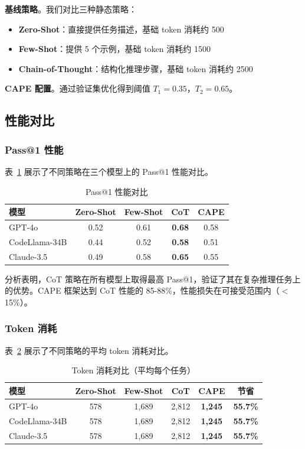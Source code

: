\documentclass[11pt,a4paper]{article}
\begin{document}
\textbf{基线策略}。我们对比三种静态策略：
\begin{itemize}[leftmargin=*]
    \item \textbf{Zero-Shot}：直接提供任务描述，基础 token 消耗约 500
    \item \textbf{Few-Shot}：提供 5 个示例，基础 token 消耗约 1500
    \item \textbf{Chain-of-Thought}：结构化推理步骤，基础 token 消耗约 2500
\end{itemize}

\textbf{CAPE 配置}。通过验证集优化得到阈值 $T_1 = 0.35$，$T_2 = 0.65$。

\subsection{性能对比}

\subsubsection{Pass@1 性能}

表~\ref{tab:pass1} 展示了不同策略在三个模型上的 Pass@1 性能对比。

\begin{table}[h]
\centering
\caption{Pass@1 性能对比}
\label{tab:pass1}
\begin{tabular}{lcccc}
\toprule
\textbf{模型} & \textbf{Zero-Shot} & \textbf{Few-Shot} & \textbf{CoT} & \textbf{CAPE} \\
\midrule
GPT-4o & 0.52 & 0.61 & \textbf{0.68} & 0.58 \\
CodeLlama-34B & 0.44 & 0.52 & \textbf{0.58} & 0.51 \\
Claude-3.5 & 0.49 & 0.58 & \textbf{0.65} & 0.55 \\
\bottomrule
\end{tabular}
\end{table}

分析表明，CoT 策略在所有模型上取得最高 Pass@1，验证了其在复杂推理任务上的优势。CAPE 框架达到 CoT 性能的 85-88\%，性能损失在可接受范围内（$<$15\%）。

\subsubsection{Token 消耗}

表~\ref{tab:tokens} 展示了不同策略的平均 token 消耗对比。

\begin{table}[h]
\centering
\caption{Token 消耗对比（平均每个任务）}
\label{tab:tokens}
\begin{tabular}{lccccc}
\toprule
\textbf{模型} & \textbf{Zero-Shot} & \textbf{Few-Shot} & \textbf{CoT} & \textbf{CAPE} & \textbf{节省} \\
\midrule
GPT-4o & 578 & 1,689 & 2,812 & \textbf{1,245} & \textbf{55.7\%} \\
CodeLlama-34B & 578 & 1,689 & 2,812 & \textbf{1,245} & \textbf{55.7\%} \\
Claude-3.5 & 578 & 1,689 & 2,812 & \textbf{1,245} & \textbf{55.7\%} \\
\bottomrule
\end{tabular}
\end{table}
\end{document}
